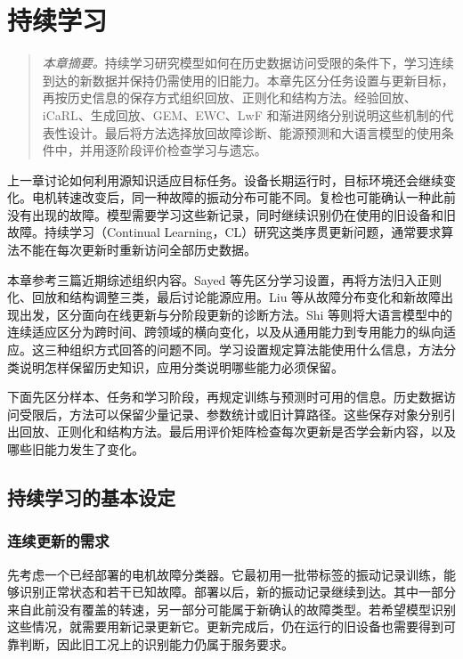 \chapter{持续学习}
\label{chap:continual}
\begin{quote}\small
\textit{本章摘要。}持续学习研究模型如何在历史数据访问受限的条件下，学习连续到达的新数据并保持仍需使用的旧能力。本章先区分任务设置与更新目标，再按历史信息的保存方式组织回放、正则化和结构方法。经验回放、iCaRL、生成回放、GEM、EWC、LwF 和渐进网络分别说明这些机制的代表性设计。最后将方法选择放回故障诊断、能源预测和大语言模型的使用条件中，并用逐阶段评价检查学习与遗忘。
\end{quote}

上一章讨论如何利用源知识适应目标任务。设备长期运行时，目标环境还会继续变化。电机转速改变后，同一种故障的振动分布可能不同。复检也可能确认一种此前没有出现的故障。模型需要学习这些新记录，同时继续识别仍在使用的旧设备和旧故障。持续学习（Continual Learning，CL）研究这类序贯更新问题，通常要求算法不能在每次更新时重新访问全部历史数据。

本章参考三篇近期综述组织内容。Sayed 等先区分学习设置，再将方法归入正则化、回放和结构调整三类，最后讨论能源应用\cite{sayed2025energycl}。Liu 等从故障分布变化和新故障出现出发，区分面向在线更新与分阶段更新的诊断方法\cite{liu2025incrementalfd}。Shi 等则将大语言模型中的连续适应区分为跨时间、跨领域的横向变化，以及从通用能力到专用能力的纵向适应\cite{shi2025llmcl}。这三种组织方式回答的问题不同。学习设置规定算法能使用什么信息，方法分类说明怎样保留历史知识，应用分类说明哪些能力必须保留。

下面先区分样本、任务和学习阶段，再规定训练与预测时可用的信息。历史数据访问受限后，方法可以保留少量记录、参数统计或旧计算路径。这些保存对象分别引出回放、正则化和结构方法。最后用评价矩阵检查每次更新是否学会新内容，以及哪些旧能力发生了变化。

\section{持续学习的基本设定}

\subsection{连续更新的需求}
先考虑一个已经部署的电机故障分类器。它最初用一批带标签的振动记录训练，能够识别正常状态和若干已知故障。部署以后，新的振动记录继续到达。其中一部分来自此前没有覆盖的转速，另一部分可能属于新确认的故障类型。若希望模型识别这些情况，就需要用新记录更新它。更新完成后，仍在运行的旧设备也需要得到可靠判断，因此旧工况上的识别能力仍属于服务要求。

